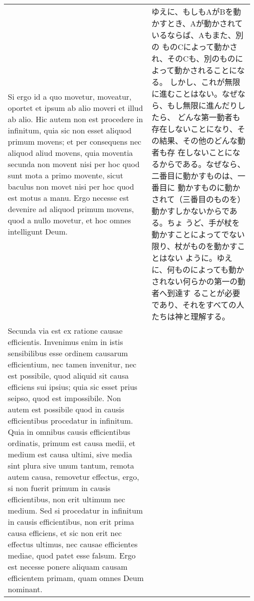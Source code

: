 \documentclass[10pt]{jsarticle}
\begin{document}
\begin{longtable}{p{21em}p{21em}}
Si ergo id a quo movetur, moveatur, oportet et ipsum ab alio moveri et
illud ab alio. Hic autem non est procedere in infinitum, quia sic non
esset aliquod primum movens; et per consequens nec aliquod aliud
movens, quia moventia secunda non movent nisi per hoc quod sunt mota a
primo movente, sicut baculus non movet nisi per hoc quod est motus a
manu. Ergo necesse est devenire ad aliquod primum movens, quod a nullo
movetur, et hoc omnes intelligunt Deum.


&

ゆえに、もしもAがBを動かすとき、Aが動かされているならば、Aもまた、別の
ものCによって動かされ、そのCも、別のものによって動かされることになる。
しかし、これが無限に進むことはない。なぜなら、もし無限に進んだりしたら、
どんな第一動者も存在しないことになり、その結果、その他のどんな動者も存
在しないことになるからである。なぜなら、二番目に動かすものは、一番目に
動かすものに動かされて（三番目のものを）動かすしかないからである。ちょ
うど、手が杖を動かすことによってでない限り、杖がものを動かすことはない
ように。ゆえに、何ものによっても動かされない何らかの第一の動者へ到達す
ることが必要であり、それをすべての人たちは神と理解する。



\\

Secunda via est ex ratione causae efficientis. Invenimus enim in istis
sensibilibus esse ordinem causarum efficientium, nec tamen invenitur,
nec est possibile, quod aliquid sit causa efficiens sui ipsius; quia
sic esset prius seipso, quod est impossibile. Non autem est possibile
quod in causis efficientibus procedatur in infinitum. Quia in omnibus
causis efficientibus ordinatis, primum est causa medii, et medium est
causa ultimi, sive media sint plura sive unum tantum, remota autem
causa, removetur effectus, ergo, si non fuerit primum in causis
efficientibus, non erit ultimum nec medium. Sed si procedatur in
infinitum in causis efficientibus, non erit prima causa efficiens, et
sic non erit nec effectus ultimus, nec causae efficientes mediae, quod
patet esse falsum. Ergo est necesse ponere aliquam causam efficientem
primam, quam omnes Deum nominant.



&


\end{longtable}
\end{document}
